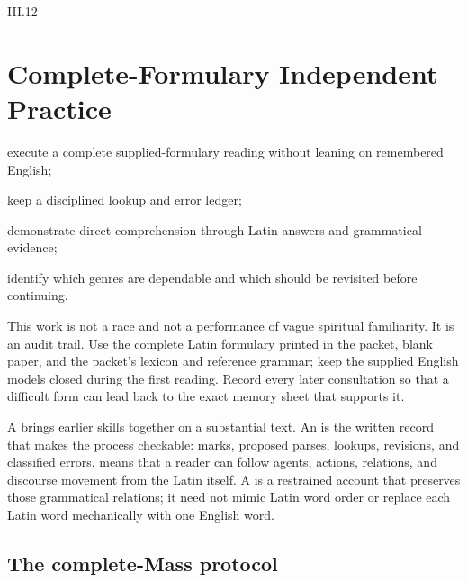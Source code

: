 \begin{courseunit}{III.12}
\chapter{Complete-Formulary Independent Practice}

\begin{learningobjectives}
  \item execute a complete supplied-formulary reading without leaning on remembered English;
  \item keep a disciplined lookup and error ledger;
  \item demonstrate direct comprehension through Latin answers and grammatical evidence;
  \item identify which genres are dependable and which should be revisited before continuing.
\end{learningobjectives}

This work is not a race and not a performance of vague spiritual familiarity.
It is an audit trail. Use the complete Latin formulary printed in the packet,
blank paper, and the packet's lexicon and reference grammar; keep the supplied
English models closed during the first reading. Record every later consultation
so that a difficult form can lead back to the exact memory sheet that supports it.

A  brings earlier skills together on a substantial
text. An  is the
written record that makes the process checkable: marks, proposed parses,
lookups, revisions, and classified errors.  means
that a reader can follow agents, actions, relations, and discourse movement
from the Latin itself. A  is a restrained account that
preserves those grammatical relations; it need not mimic Latin word order or
replace each Latin word mechanically with one English word.

\section{The complete-Mass protocol}


\end{courseunit}
